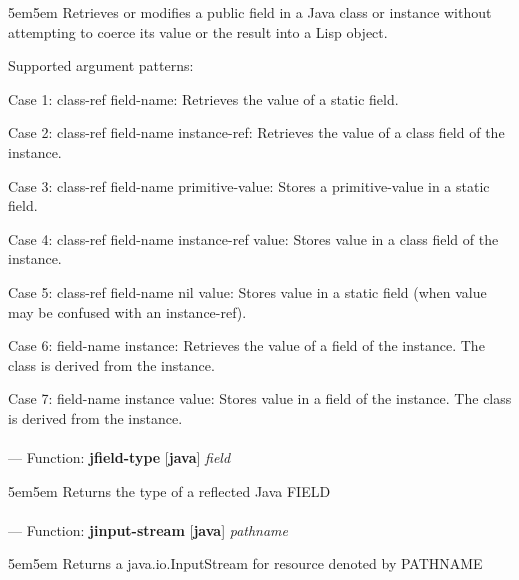 \begin{adjustwidth}{5em}{5em}
Retrieves or modifies a public field in a Java class or instance without
attempting to coerce its value or the result into a Lisp object.

Supported argument patterns:

   Case 1: class-ref  field-name:
      Retrieves the value of a static field.

   Case 2: class-ref  field-name  instance-ref:
      Retrieves the value of a class field of the instance.

   Case 3: class-ref  field-name  primitive-value:
      Stores a primitive-value in a static field.

   Case 4: class-ref  field-name  instance-ref  value:
      Stores value in a class field of the instance.

   Case 5: class-ref  field-name  nil  value:
      Stores value in a static field (when value may be
      confused with an instance-ref).

   Case 6: field-name  instance:
      Retrieves the value of a field of the instance. The
      class is derived from the instance.

   Case 7: field-name  instance  value:
      Stores value in a field of the instance. The class is
      derived from the instance.


\end{adjustwidth}

\paragraph{}
\label{JAVA:JFIELD-TYPE}
--- Function: \textbf{jfield-type} [\textbf{java}] \textit{field}

\begin{adjustwidth}{5em}{5em}
Returns the type of a reflected Java FIELD
\end{adjustwidth}

\paragraph{}
\label{JAVA:JINPUT-STREAM}
--- Function: \textbf{jinput-stream} [\textbf{java}] \textit{pathname}

\begin{adjustwidth}{5em}{5em}
Returns a java.io.InputStream for resource denoted by PATHNAME
\end{adjustwidth}

